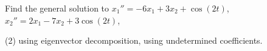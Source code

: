 \documentclass{ximera}
\begin{document}
\begin{exercise}
    Find the general solution to $x_1'' = -6x_1+ 3x_2 + \cos (2t)$, $x_2'' = 2x_1 -7x_2 + 3\cos (2t)$,
    \begin{tasks}(2)
        \task using eigenvector decomposition,
        \task using undetermined coefficients.
    \end{tasks}
\end{exercise}
\end{document}

